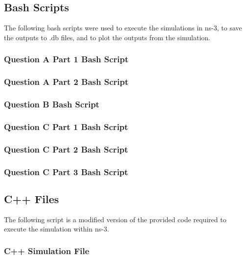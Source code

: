 \subsection{Bash Scripts}
The following bash scripts were used to execute the simulations in ns-3, to save
the outputs to .db files, and to plot the outputs from the simulation.
\subsubsection{Question A Part 1 Bash Script}

\subsubsection{Question A Part 2 Bash Script}

\subsubsection{Question B Bash Script}

\subsubsection{Question C Part 1 Bash Script}

\subsubsection{Question C Part 2 Bash Script}

\subsubsection{Question C Part 3 Bash Script}


\subsection{C++ Files}
The following script is a modified version of the provided code required to
execute the simulation within ns-3.
\subsubsection{C++ Simulation File}


